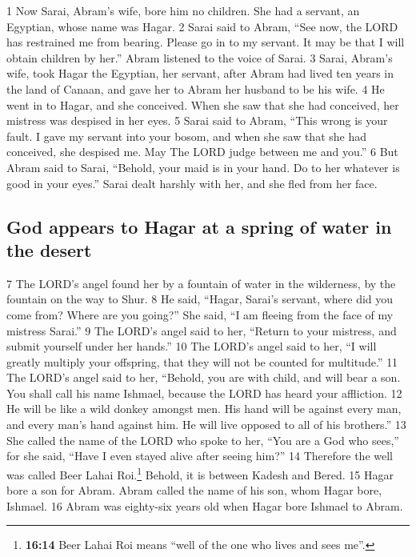{1} Now Sarai, Abram's wife, bore him no children. She had a servant, an
Egyptian, whose name was Hagar. {2} Sarai said to Abram, ``See now, the
LORD has restrained me from bearing. Please go in to my servant. It may
be that I will obtain children by her.'' Abram listened to the voice of
Sarai. {3} Sarai, Abram's wife, took Hagar the Egyptian, her servant,
after Abram had lived ten years in the land of Canaan, and gave her to
Abram her husband to be his wife. {4} He went in to Hagar, and she
conceived. When she saw that she had conceived, her mistress was
despised in her eyes. {5} Sarai said to Abram, ``This wrong is your
fault. I gave my servant into your bosom, and when she saw that she had
conceived, she despised me. May The LORD judge between me and you.'' {6}
But Abram said to Sarai, ``Behold, your maid is in your hand. Do to her
whatever is good in your eyes.'' Sarai dealt harshly with her, and she
fled from her face.

\hypertarget{god-appears-to-hagar-at-a-spring-of-water-in-the-desert}{%
\subsection{God appears to Hagar at a spring of water in the
desert}\label{god-appears-to-hagar-at-a-spring-of-water-in-the-desert}}

{7} The LORD's angel found her by a fountain of water in the wilderness,
by the fountain on the way to Shur. {8} He said, ``Hagar, Sarai's
servant, where did you come from? Where are you going?'' She said, ``I
am fleeing from the face of my mistress Sarai.'' {9} The LORD's angel
said to her, ``Return to your mistress, and submit yourself under her
hands.'' {10} The LORD's angel said to her, ``I will greatly multiply
your offspring, that they will not be counted for multitude.'' {11} The
LORD's angel said to her, ``Behold, you are with child, and will bear a
son. You shall call his name Ishmael, because the LORD has heard your
affliction. {12} He will be like a wild donkey amongst men. His hand
will be against every man, and every man's hand against him. He will
live opposed to all of his brothers.'' {13} She called the name of the
LORD who spoke to her, ``You are a God who sees,'' for she said, ``Have
I even stayed alive after seeing him?'' {14} Therefore the well was
called Beer Lahai Roi.\footnote{\textbf{16:14} Beer Lahai Roi means
  ``well of the one who lives and sees me''.} Behold, it is between
Kadesh and Bered. {15} Hagar bore a son for Abram. Abram called the name
of his son, whom Hagar bore, Ishmael. {16} Abram was eighty-six years
old when Hagar bore Ishmael to Abram.

